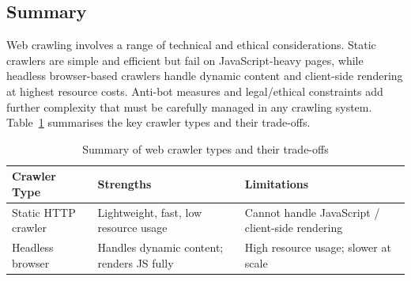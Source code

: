 \subsection{Summary}\label{subsec:web_crawling_summary}

Web crawling involves a range of technical and ethical considerations.
Static crawlers are simple and efficient but fail on JavaScript-heavy pages, while headless browser-based crawlers handle dynamic content and client-side rendering at highest resource costs.
Anti-bot measures and legal/ethical constraints add further complexity that must be carefully managed in any crawling system.
Table~\ref{tab:web_crawling_summary} summarises the key crawler types and their trade-offs.

\begin{table}[h]
    \centering
    \small
    \renewcommand{\arraystretch}{1.4}
    \begin{tabularx}{\textwidth}{p{4cm} X X}
        \toprule
        \textbf{Crawler Type} & \textbf{Strengths} & \textbf{Limitations} \\
        \midrule
        Static HTTP crawler & Lightweight, fast, low resource usage & Cannot handle JavaScript / client-side rendering \\
        Headless browser & Handles dynamic content; renders JS fully & High resource usage; slower at scale \\
        \bottomrule
    \end{tabularx}
    \caption{Summary of web crawler types and their trade-offs}
    \label{tab:web_crawling_summary}
\end{table}

